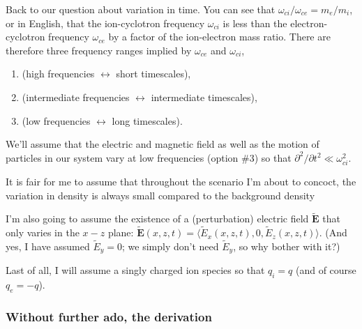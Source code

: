 Back to our question about variation in time. You can see that
$\omega_{ci} / \omega_{ce} = m_e/m_i$, or in English, that the ion-cyclotron
frequency $\omega_{ci}$ is less than the electron-cyclotron frequency
$\omega_{ce}$ by a factor of the ion-electron mass ratio. There are therefore
three frequency ranges implied by $\omega_{ce}$ and $\omega_{ci}$, \par
\begin{enumerate}
\item {} (high frequencies $\leftrightarrow$ short timescales),
\item {} (intermediate frequencies $\leftrightarrow$ intermediate timescales),
\item {} (low frequencies $\leftrightarrow$ long timescales).
\end{enumerate}
We'll assume that the electric and magnetic field as well as the motion of
particles in our system vary at low frequencies (option \#3) so that
$\partial^2 / \partial t^2 \ll \omega_{ci}^2$.


It is fair for me to assume that throughout the scenario I'm about to concoct,
the variation in density is always small compared to the background density

I'm also going to assume the existence of a (perturbation) electric field
$\mathbf{\tilde E}$ that only varies in the $x-z$ plane:
$\mathbf{\tilde E} (x, z, t) = \langle \tilde E_x (x, z, t), 0, \tilde E_z (x,
z, t) \rangle$.
(And yes, I have assumed $\tilde E_y = 0$; we simply don't need $\tilde E_y$, so why bother
with it?)

Last of all, I will assume a singly charged ion species so that $q_i = q$ (and
of course $q_e = -q$).

\subsubsection{Without further ado, the derivation}

